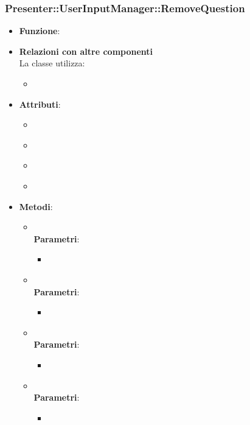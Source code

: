 \subsubsection{Presenter::UserInputManager::RemoveQuestion}
\begin{itemize}
\item\textbf{Funzione}:
\item\textbf{Relazioni con altre componenti}\\
La classe utilizza:
	\begin{itemize}
		\item
	\end{itemize}
\item\textbf{Attributi}:
	\begin{itemize}
		\item\code{}\\
		\item\code{}\\
		\item\code{}\\
		\item\code{}\\
	\end{itemize}
\item\textbf{Metodi}:
	\begin{itemize}
		\item\code{}\\
		\textbf{Parametri}:
			\begin{itemize}
				\item\code{}\\
			\end{itemize}
		\item\code{}\\
		\textbf{Parametri}:
			\begin{itemize}
				\item\code{}\\
			\end{itemize}
		\item\code{}\\
		\textbf{Parametri}:
			\begin{itemize}
				\item\code{}\\
			\end{itemize}
		\item\code{}\\
		\textbf{Parametri}:
			\begin{itemize}
				\item\code{}\\
			\end{itemize}
	\end{itemize}
\end{itemize}

